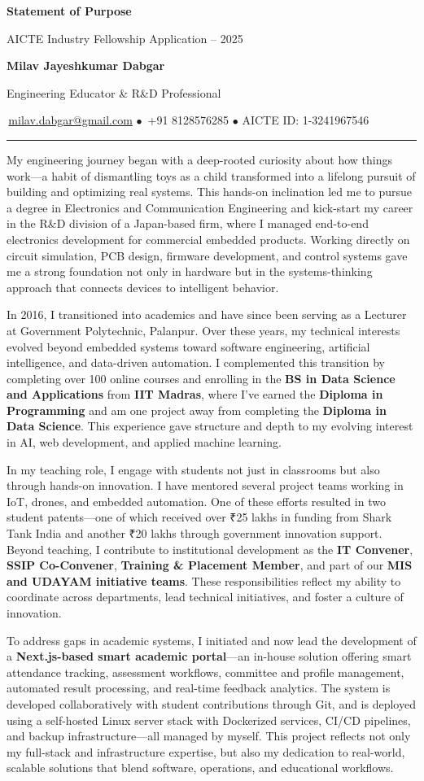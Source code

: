 \documentclass[12pt,a4paper]{article}
\makeatletter
\newcommand{\makeheader}{
    \begin{center}
        {\Huge\sffamily\bfseries\color{primary} Statement of Purpose}
        
        \vspace{10pt}
        {\Large\sffamily\color{secondary} AICTE Industry Fellowship Application -- 2025}
        
        \vspace{15pt}
        {\large\sffamily\bfseries\color{accent} Milav Jayeshkumar Dabgar}
        
        \vspace{8pt}
        {\normalsize\color{secondary} Engineering Educator \& R\&D Professional}
        
        \vspace{8pt}
        {\small\color{secondary}
        \faIcon{envelope}\,\href{mailto:milav.dabgar@gmail.com}{\color{primary}milav.dabgar@gmail.com} $\bullet$
        \faIcon{phone}\,+91 8128576285 $\bullet$
        AICTE ID: 1-3241967546}
        
        \vspace{5pt}
        \rule{0.8\textwidth}{0.5pt}
    \end{center}
    \vspace{15pt}
}
\makeatother
\begin{document}
\makeheader

My engineering journey began with a deep-rooted curiosity about how things work—a habit of dismantling toys as a child transformed into a lifelong pursuit of building and optimizing real systems. This hands-on inclination led me to pursue a degree in Electronics and Communication Engineering and kick-start my career in the R\&D division of a Japan-based firm, where I managed end-to-end electronics development for commercial embedded products. Working directly on circuit simulation, PCB design, firmware development, and control systems gave me a strong foundation not only in hardware but in the systems-thinking approach that connects devices to intelligent behavior.

In 2016, I transitioned into academics and have since been serving as a Lecturer at Government Polytechnic, Palanpur. Over these years, my technical interests evolved beyond embedded systems toward software engineering, artificial intelligence, and data-driven automation. I complemented this transition by completing over 100 online courses and enrolling in the \textbf{BS in Data Science and Applications} from \textbf{IIT Madras}, where I've earned the \textbf{Diploma in Programming} and am one project away from completing the \textbf{Diploma in Data Science}. This experience gave structure and depth to my evolving interest in AI, web development, and applied machine learning.

In my teaching role, I engage with students not just in classrooms but also through hands-on innovation. I have mentored several project teams working in IoT, drones, and embedded automation. One of these efforts resulted in two student patents—one of which received over ₹25 lakhs in funding from Shark Tank India and another ₹20 lakhs through government innovation support. Beyond teaching, I contribute to institutional development as the \textbf{IT Convener}, \textbf{SSIP Co-Convener}, \textbf{Training \& Placement Member}, and part of our \textbf{MIS and UDAYAM initiative teams}. These responsibilities reflect my ability to coordinate across departments, lead technical initiatives, and foster a culture of innovation.

To address gaps in academic systems, I initiated and now lead the development of a \textbf{Next.js-based smart academic portal}—an in-house solution offering smart attendance tracking, assessment workflows, committee and profile management, automated result processing, and real-time feedback analytics. The system is developed collaboratively with student contributions through Git, and is deployed using a self-hosted Linux server stack with Dockerized services, CI/CD pipelines, and backup infrastructure—all managed by myself. This project reflects not only my full-stack and infrastructure expertise, but also my dedication to real-world, scalable solutions that blend software, operations, and educational workflows.
\end{document}
